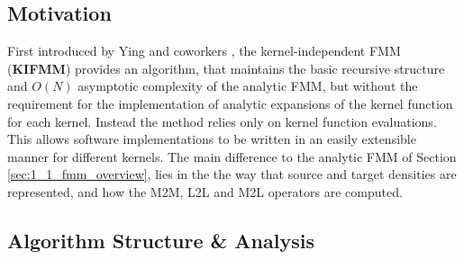 \subsection{Motivation}

First introduced by Ying and coworkers \cite{Ying:2004:JCP}, the kernel-independent FMM (\textbf{\gls{KIFMM}})
provides an algorithm, that maintains the basic recursive structure and $O(N)$
asymptotic complexity of the analytic FMM, but without the requirement for the
implementation of analytic expansions of the kernel function for each kernel.
Instead the method relies only on kernel function evaluations. This allows
software implementations to be written in an easily extensible manner for different
kernels. The main difference to the analytic FMM of Section \ref{sec:1_1_fmm_overview},
lies in the the way that source and target densities are represented, and how
the M2M, L2L and M2L operators are computed.

\subsection{Algorithm Structure \& Analysis}

